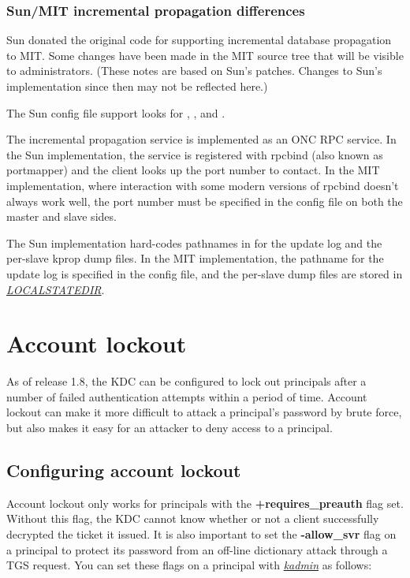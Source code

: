 \documentclass[letterpaper,10pt,english]{sphinxmanual}
\begin{document}
\subsection{Sun/MIT incremental propagation differences}
\label{admin/database:sun-mit-incremental-propagation-differences}
Sun donated the original code for supporting incremental database
propagation to MIT.  Some changes have been made in the MIT source
tree that will be visible to administrators.  (These notes are based
on Sun's patches.  Changes to Sun's implementation since then may not
be reflected here.)

The Sun config file support looks for ,
, and .

The incremental propagation service is implemented as an ONC RPC
service.  In the Sun implementation, the service is registered with
rpcbind (also known as portmapper) and the client looks up the port
number to contact.  In the MIT implementation, where interaction with
some modern versions of rpcbind doesn't always work well, the port
number must be specified in the config file on both the master and
slave sides.

The Sun implementation hard-codes pathnames in  for the
update log and the per-slave kprop dump files.  In the MIT
implementation, the pathname for the update log is specified in the
config file, and the per-slave dump files are stored in
{\hyperref[mitK5defaults:paths]{\emph{LOCALSTATEDIR}}}.


\chapter{Account lockout}
\label{admin/lockout::doc}\label{admin/lockout:account-lockout}
As of release 1.8, the KDC can be configured to lock out principals
after a number of failed authentication attempts within a period of
time.  Account lockout can make it more difficult to attack a
principal's password by brute force, but also makes it easy for an
attacker to deny access to a principal.


\section{Configuring account lockout}
\label{admin/lockout:configuring-account-lockout}
Account lockout only works for principals with the
\textbf{+requires\_preauth} flag set.  Without this flag, the KDC cannot
know whether or not a client successfully decrypted the ticket it
issued.  It is also important to set the \textbf{-allow\_svr} flag on a
principal to protect its password from an off-line dictionary attack
through a TGS request.  You can set these flags on a principal with
{\hyperref[admin/admin_commands/kadmin_local:kadmin-1]{\emph{kadmin}}} as follows:
\end{document}
